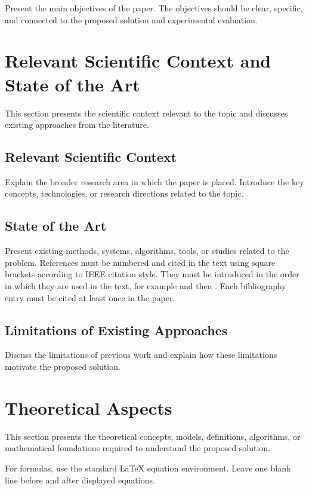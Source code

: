 \documentclass[12pt,a4paper]{article}
\begin{document}
Present the main objectives of the paper. The objectives should be clear, specific, and connected to the proposed solution and experimental evaluation.

\section{Relevant Scientific Context and State of the Art}

This section presents the scientific context relevant to the topic and discusses existing approaches from the literature.

\subsection{Relevant Scientific Context}

Explain the broader research area in which the paper is placed. Introduce the key concepts, technologies, or research directions related to the topic.

\subsection{State of the Art}

Present existing methods, systems, algorithms, tools, or studies related to the problem. References must be numbered and cited in the text using square brackets according to IEEE citation style. They must be introduced in the order in which they are used in the text, for example \cite{b1} and then \cite{b2}. Each bibliography entry must be cited at least once in the paper.

\subsection{Limitations of Existing Approaches}

Discuss the limitations of previous work and explain how these limitations motivate the proposed solution.

\section{Theoretical Aspects}

This section presents the theoretical concepts, models, definitions, algorithms, or mathematical foundations required to understand the proposed solution.

For formulas, use the standard LaTeX equation environment. Leave one blank line before and after displayed equations.
\end{document}
